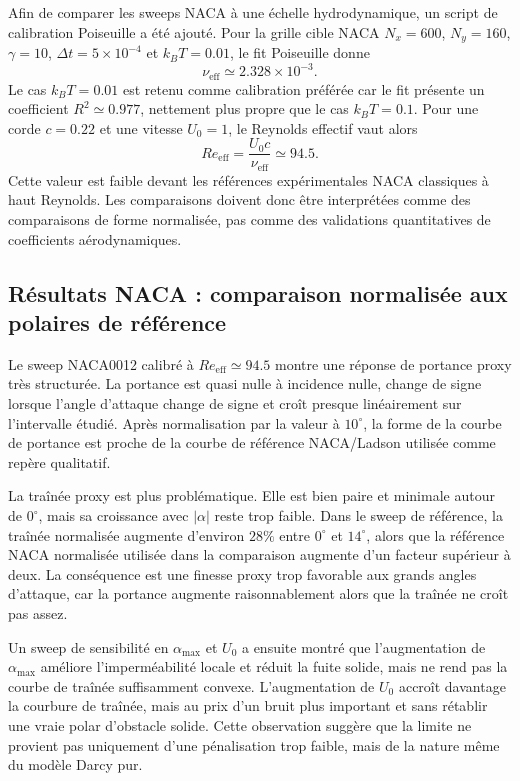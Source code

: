 \documentclass[11pt,a4paper]{article}
\begin{document}
Afin de comparer les sweeps NACA à une échelle hydrodynamique, un script de calibration Poiseuille a été ajouté. Pour la grille cible NACA $N_x=600$, $N_y=160$, $\gamma=10$, $\Delta t=5\times10^{-4}$ et $k_BT=0.01$, le fit Poiseuille donne
\begin{equation}
  \nu_{\mathrm{eff}}\simeq 2.328\times 10^{-3}.
\end{equation}
Le cas $k_BT=0.01$ est retenu comme calibration préférée car le fit présente un coefficient $R^2\simeq0.977$, nettement plus propre que le cas $k_BT=0.1$. Pour une corde $c=0.22$ et une vitesse $U_0=1$, le Reynolds effectif vaut alors
\begin{equation}
  Re_{\mathrm{eff}}=\frac{U_0 c}{\nu_{\mathrm{eff}}}\simeq94.5.
\end{equation}
Cette valeur est faible devant les références expérimentales NACA classiques à haut Reynolds. Les comparaisons doivent donc être interprétées comme des comparaisons de forme normalisée, pas comme des validations quantitatives de coefficients aérodynamiques.

\subsection{Résultats NACA : comparaison normalisée aux polaires de référence}

Le sweep NACA0012 calibré à $Re_{\mathrm{eff}}\simeq94.5$ montre une réponse de portance proxy très structurée. La portance est quasi nulle à incidence nulle, change de signe lorsque l'angle d'attaque change de signe et croît presque linéairement sur l'intervalle étudié. Après normalisation par la valeur à $10^\circ$, la forme de la courbe de portance est proche de la courbe de référence NACA/Ladson utilisée comme repère qualitatif.

La traînée proxy est plus problématique. Elle est bien paire et minimale autour de $0^\circ$, mais sa croissance avec $|\alpha|$ reste trop faible. Dans le sweep de référence, la traînée normalisée augmente d'environ $28\%$ entre $0^\circ$ et $14^\circ$, alors que la référence NACA normalisée utilisée dans la comparaison augmente d'un facteur supérieur à deux. La conséquence est une finesse proxy trop favorable aux grands angles d'attaque, car la portance augmente raisonnablement alors que la traînée ne croît pas assez.

Un sweep de sensibilité en $\alpha_{\max}$ et $U_0$ a ensuite montré que l'augmentation de $\alpha_{\max}$ améliore l'imperméabilité locale et réduit la fuite solide, mais ne rend pas la courbe de traînée suffisamment convexe. L'augmentation de $U_0$ accroît davantage la courbure de traînée, mais au prix d'un bruit plus important et sans rétablir une vraie polar d'obstacle solide. Cette observation suggère que la limite ne provient pas uniquement d'une pénalisation trop faible, mais de la nature même du modèle Darcy pur.
\end{document}
